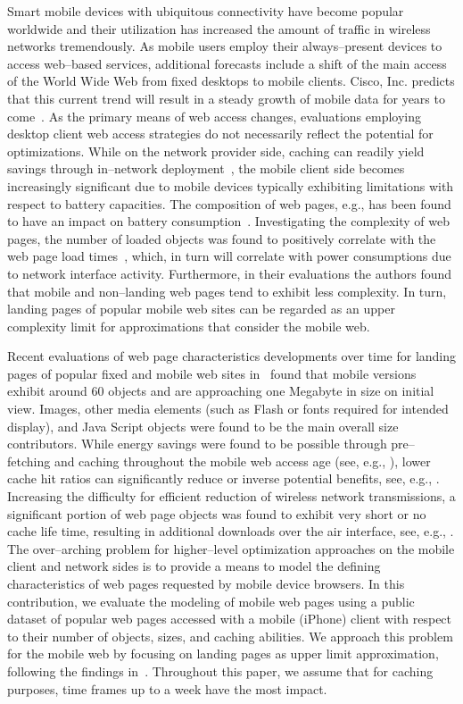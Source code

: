 \documentclass[letterpaper,conference]{IEEEtran}
\begin{document}
Smart mobile devices with ubiquitous connectivity have become popular worldwide and their utilization has increased the amount of traffic in wireless networks tremendously. 
As mobile users employ their always--present devices to access web--based services, additional forecasts include a shift of the main access of the World Wide Web from fixed desktops to mobile clients. 
Cisco, Inc. predicts that this current trend will result in a steady growth of mobile data for years to come~\cite{VNI14}.
As the primary means of web access changes, evaluations employing desktop client web access strategies do not necessarily reflect the potential for optimizations.
While on the network provider side, caching can readily yield savings through in--network deployment~\cite{IhPa11}, the mobile client side becomes increasingly significant due to mobile devices typically exhibiting limitations with respect to battery capacities.
The composition of web pages, e.g., has been found to have an impact on battery consumption~\cite{ThAgNiBoSi12}.
Investigating the complexity of web pages, the number of loaded objects was found to positively correlate with the web page load times~\cite{BuMaSe13}, which, in turn will correlate with power consumptions due to network interface activity.
Furthermore, in their evaluations the authors found that mobile and non--landing web pages tend to exhibit less complexity. 
In turn, landing pages of popular mobile web sites can be regarded as an upper complexity limit for approximations that consider the mobile web.

Recent evaluations of web page characteristics developments over time for landing pages of popular fixed and mobile web sites in~\cite{JoSe14Commag} found that mobile versions exhibit around 60 objects and are approaching one Megabyte in size on initial view. 
Images, other media elements (such as Flash or fonts required for intended display), and Java Script objects were found to be the main overall size contributors.
While energy savings were found to be possible through pre--fetching and caching throughout the mobile web access age (see, e.g., \cite{SaIs02, ShKuDaWa05,ThChWo13}),
lower cache hit ratios can significantly reduce or inverse potential benefits, see, e.g., \cite{Wang:2012ks,Marquez:2008wf}.
Increasing the difficulty for efficient reduction of wireless network transmissions, a significant portion of web page objects was found to exhibit very short or no cache life time, resulting in additional downloads over the air interface, see, e.g., \cite{JoSe14Commag,Qian:2014dw,JoSe14GreenComm}.
The over--arching problem for higher--level optimization approaches on the mobile client and network sides is to provide a means to model the defining characteristics of web pages requested by mobile device browsers. 
In this contribution, we evaluate the modeling of mobile web pages using a public dataset of popular web pages accessed with a mobile (iPhone) client with respect to their number of objects, sizes, and caching abilities.
We approach this problem for the mobile web by focusing on landing pages as upper limit approximation, following the findings in~\cite{BuMaSe13}.
Throughout this paper, we assume that for caching purposes, time frames up to a week have the most impact.
\end{document}
